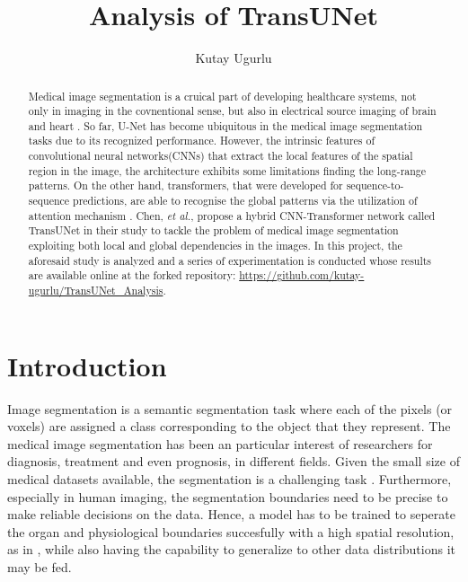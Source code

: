 \documentclass{IEEEtran}
\title{Analysis of TransUNet}
\author{Kutay Ugurlu}
\begin{document}
\maketitle
\begin{abstract}
    Medical image segmentation is a cruical part of developing healthcare systems, not only in imaging in the covnentional sense, but also in electrical source imaging of brain and heart \cite{gonzalez2020ecgi}. So far, U-Net\cite[text]{ronneberger2015u} has become ubiquitous in the medical image segmentation tasks due to its recognized performance. However, the intrinsic features of convolutional neural networks(CNNs) that extract the local features of the spatial region in the image, the architecture exhibits some limitations finding the long-range patterns. On the other hand, transformers, that were developed for sequence-to-sequence predictions, are able to recognise the global patterns via the utilization of attention mechanism \cite{vaswani2017attention}. Chen, \textit{et al.}, propose a hybrid CNN-Transformer network called TransUNet in their study  \cite{chen2021transunet} to tackle the problem of medical image segmentation exploiting both local and global dependencies in the images.
    In this project, the aforesaid study is analyzed and a series of experimentation is conducted whose results are available online at the forked repository: \href{https://github.com/kutay-ugurlu/TransUNet_Analysis}{https://github.com/kutay-ugurlu/TransUNet\_Analysis}. 
\end{abstract}
\section{Introduction}

Image segmentation is a semantic segmentation task where each of the pixels (or voxels) are assigned a class corresponding to the object that they represent. The medical image segmentation has been an particular interest of researchers for diagnosis, treatment and even prognosis, in different fields. Given the small size of medical datasets available, the segmentation is a challenging task \cite{ren2019brain}. Furthermore, especially in human imaging, the segmentation boundaries need to be precise to make reliable decisions on the data. Hence, a model has to be trained to seperate the organ and physiological boundaries succesfully with a high spatial resolution, as in , while also having the capability to generalize to other data distributions it may be fed. 
\end{document}
